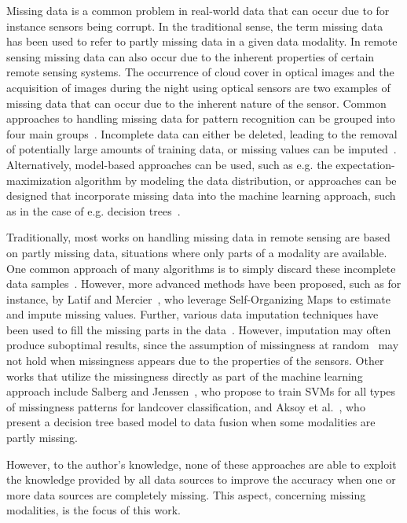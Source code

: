 \documentclass[journal]{IEEEtran}
\begin{document}
Missing data is a common problem in real-world data that can occur due to for instance sensors being corrupt. In the traditional sense, the term missing data has been used to refer to partly missing data in a given data modality. In remote sensing missing data can also occur due to the inherent properties of certain remote sensing systems. The occurrence of cloud cover in optical images and the acquisition of images during the night using optical sensors are two examples of missing data that can occur due to the inherent nature of the sensor.
Common approaches to handling missing data for pattern recognition can be grouped into four main groups~\cite{garcia2010pattern}. Incomplete data can either be deleted, leading to the removal of potentially large amounts of training data, or missing values can be imputed~\cite{schafer1997analysis}. Alternatively, model-based approaches can be used, such as e.g. the expectation-maximization algorithm by modeling the data distribution, or approaches can be designed that incorporate missing data into the machine learning approach, such as in the case of e.g. decision trees~\cite{garcia2010pattern}.

Traditionally, most works on handling missing data in remote sensing are based on partly missing data, situations where only parts of a modality are available. One common approach of many algorithms is to simply discard these incomplete data samples~\cite{aksoy2009land}. However, more advanced methods have been proposed, such as for instance, by Latif and Mercier~\cite{latif2010self}, who leverage Self-Organizing Maps to estimate and impute missing values. Further, various data imputation techniques have been used to fill the missing parts in the data~\cite{shen2015missing}. However, imputation may often produce suboptimal results, since the assumption of missingness at random~\cite{schafer1997analysis} may not hold when missingness appears due to the properties of the sensors.
Other works that utilize the missingness directly as part of the machine learning approach include Salberg and Jenssen~\cite{salberg2012land}, who propose to train SVMs for all types of missingness patterns for landcover classification, and  Aksoy et al.~\cite{aksoy2009land}, who present a decision tree based model to data fusion when some modalities are partly missing.

However, to the author's knowledge, none of these approaches are able to exploit the knowledge provided by all data sources to improve the accuracy when one or more data sources are completely missing. This aspect, concerning missing modalities, is the focus of this work.
\end{document}
